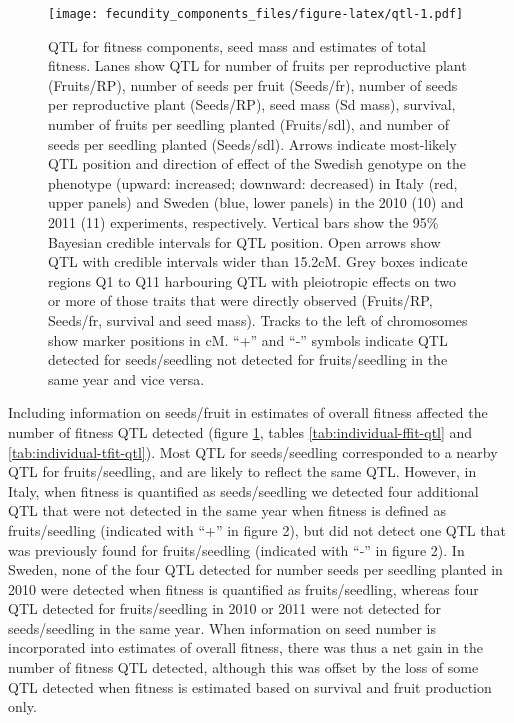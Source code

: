 \documentclass[]{article}
\begin{document}
\begin{figure}
\centering
\texttt{[image: fecundity\_components\_files/figure-latex/qtl-1.pdf]}
\caption{\label{fig:qtl}QTL for fitness components, seed mass and estimates of total fitness. Lanes show QTL for number of fruits per reproductive plant (Fruits/RP), number of seeds per fruit (Seeds/fr), number of seeds per reproductive plant (Seeds/RP), seed mass (Sd mass), survival, number of fruits per seedling planted (Fruits/sdl), and number of seeds per seedling planted (Seeds/sdl). Arrows indicate most-likely QTL position and direction of effect of the Swedish genotype on the phenotype (upward: increased; downward: decreased) in Italy (red, upper panels) and Sweden (blue, lower panels) in the 2010 (10) and 2011 (11) experiments, respectively. Vertical bars show the 95\% Bayesian credible intervals for QTL position. Open arrows show QTL with credible intervals wider than 15.2cM. Grey boxes indicate regions Q1 to Q11 harbouring QTL with pleiotropic effects on two or more of those traits that were directly observed (Fruits/RP, Seeds/fr, survival and seed mass). Tracks to the left of chromosomes show marker positions in cM. ``+'' and ``-'' symbols indicate QTL detected for seeds/seedling not detected for fruits/seedling in the same year and vice versa.}
\end{figure}

Including information on seeds/fruit in estimates of overall fitness affected the number of fitness QTL detected (figure \ref{fig:qtl}, tables \ref{tab:individual-ffit-qtl} and \ref{tab:individual-tfit-qtl}). Most QTL for seeds/seedling corresponded to a nearby QTL for fruits/seedling, and are likely to reflect the same QTL. However, in Italy, when fitness is quantified as seeds/seedling we detected four additional QTL that were not detected in the same year when fitness is defined as fruits/seedling (indicated with ``+'' in figure 2), but did not detect one QTL that was previously found for fruits/seedling (indicated with ``-'' in figure 2). In Sweden, none of the four QTL detected for number seeds per seedling planted in 2010 were detected when fitness is quantified as fruits/seedling, whereas four QTL detected for fruits/seedling in 2010 or 2011 were not detected for seeds/seedling in the same year. When information on seed number is incorporated into estimates of overall fitness, there was thus a net gain in the number of fitness QTL detected, although this was offset by the loss of some QTL detected when fitness is estimated based on survival and fruit production only.
\end{document}

